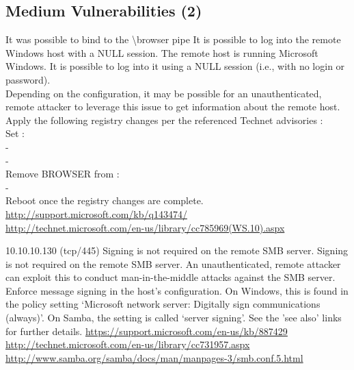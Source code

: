 
\subsection{Medium Vulnerabilities (2)}
\begin{tcolorbox}[
	title=Microsoft Windows SMB NULL Session Authentication - Nessus Plugin ID 26920,
	colback=yellow!5!white,
	colframe=yellow!75!black,
	subtitle style={boxrule=0.4pt, colback=yellow!50!white}	
	] 
	It was possible to bind to the \textbackslash browser pipe
It is possible to log into the remote Windows host with a NULL session.
The remote host is running Microsoft Windows. It is possible to log into it using a NULL session (i.e., with no login or password).\\
Depending on the configuration, it may be possible for an unauthenticated, remote attacker to leverage this issue to get information about the remote host.
Apply the following registry changes per the referenced Technet advisories :\\
Set :\\
-\\
-\\
Remove BROWSER from :\\
-\\ 
Reboot once the registry changes are complete.
\url{http://support.microsoft.com/kb/q143474/}\\
\url{http://technet.microsoft.com/en-us/library/cc785969(WS.10).aspx}
\end{tcolorbox}

\begin{tcolorbox}[
	title=SMB Signing Disabled - Nessus Plugin ID 57608,
	colback=yellow!5!white,
	colframe=yellow!75!black,
	subtitle style={boxrule=0.4pt, colback=yellow!50!white}	
	] 
	10.10.10.130 (tcp/445)
Signing is not required on the remote SMB server.
Signing is not required on the remote SMB server. An unauthenticated, remote attacker can exploit this to conduct man-in-the-middle attacks against the SMB server.
Enforce message signing in the host's configuration. On Windows, this is found in the policy setting `Microsoft network server: Digitally sign communications (always)'. On Samba, the setting is called `server signing'. See the 'see also' links for further details.
\url{https://support.microsoft.com/en-us/kb/887429}\\
\url{http://technet.microsoft.com/en-us/library/cc731957.aspx}\\
\url{http://www.samba.org/samba/docs/man/manpages-3/smb.conf.5.html}
\end{tcolorbox}
